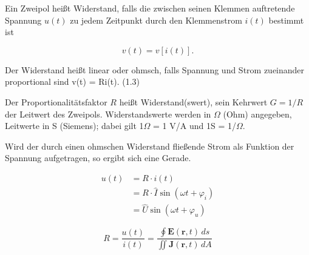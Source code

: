 \documentclass[
  ngerman,
  letterpaper,
]{scrbook}
\begin{document}
\begin{tcolorbox}[enhanced jigsaw, titlerule=0mm, rightrule=.15mm, toprule=.15mm, colback=white, toptitle=1mm, bottomrule=.15mm, coltitle=black, leftrule=.75mm, arc=.35mm, colbacktitle=quarto-callout-note-color!10!white, opacityback=0, bottomtitle=1mm, colframe=quarto-callout-note-color-frame, opacitybacktitle=0.6, breakable, title=\textcolor{quarto-callout-note-color}{\faInfo}\hspace{0.5em}{Widerstand \(R\) - Einheit: 1 \(\Omega\)}, left=2mm]

Ein Zweipol heißt Widerstand, falls die zwischen seinen Klemmen
auftretende Spannung \(u(t)\) zu jedem Zeitpunkt durch den Klemmenstrom
\(i(t)\) bestimmt ist

\[
v(t) = v[i(t)].
\]

Der Widerstand heißt linear oder ohmsch, falls Spannung und Strom
zueinander proportional sind v(t) = Ri(t). (1.3)

Der Proportionalitätsfaktor \(R\) heißt Widerstand(swert), sein Kehrwert
\(G = 1/R\) der Leitwert des Zweipols. Widerstandswerte werden in
\(\Omega\) (Ohm) angegeben, Leitwerte in S (Siemens); dabei gilt
1\(\Omega\) = 1 V/A und 1S = 1/\(\Omega\).

Wird der durch einen ohmschen Widerstand fließende Strom als Funktion
der Spannung aufgetragen, so ergibt sich eine Gerade.

\begin{align}
u(t) &= R \cdot i(t) \\
&= R \cdot \hat{I} \sin(\omega t + \varphi_i) \\
&= \hat{U} \sin(\omega t + \varphi_u)
\end{align}

\[
R = \frac{u(t)}{i(t)} = \frac{\oint \mathbf{E}(\mathbf{r},t) \, ds}{\iint \mathbf{J}(\mathbf{r},t) \, dA}
\]

\end{tcolorbox}
\end{document}
